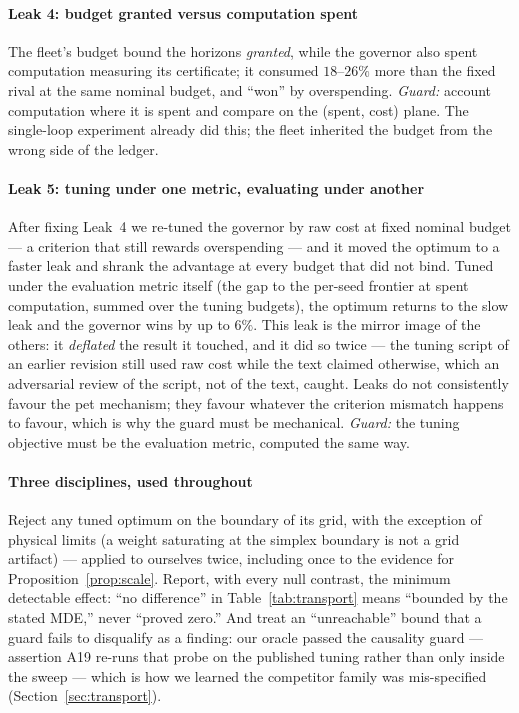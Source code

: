 \documentclass[journal]{IEEEtran}
\theoremstyle{definition}
\begin{document}
\paragraph{Leak 4: budget granted versus computation spent}
The fleet's budget bound the horizons \emph{granted}, while the governor also
spent computation measuring its certificate; it consumed $18$--$26\%$ more
than the fixed rival at the same nominal budget, and ``won'' by
overspending. \emph{Guard:} account computation where it is spent and compare
on the (spent, cost) plane. The single-loop experiment already did this; the
fleet inherited the budget from the wrong side of the ledger.

\paragraph{Leak 5: tuning under one metric, evaluating under another}
After fixing Leak~4 we re-tuned the governor by raw cost at fixed nominal
budget --- a criterion that still rewards overspending --- and it moved the
optimum to a faster leak and shrank the advantage at every budget that did not
bind. Tuned under the evaluation metric itself (the gap to the per-seed
frontier at spent computation, summed over the tuning budgets), the optimum
returns to the slow leak and the governor wins by up to $6\%$. This
leak is the mirror image of the others: it \emph{deflated} the result it
touched, and it did so twice --- the tuning script of an earlier revision still
used raw cost while the text claimed otherwise, which an adversarial review of
the script, not of the text, caught. Leaks do not consistently favour the pet
mechanism; they favour whatever the criterion mismatch happens to favour, which
is why the guard must be mechanical. \emph{Guard:} the tuning objective must
be the evaluation metric, computed the same way.

\paragraph{Three disciplines, used throughout}
Reject any tuned optimum on the boundary of its grid, with the exception of
physical limits (a weight saturating at the simplex boundary is not a grid
artifact) --- applied to ourselves twice, including once to the evidence for
Proposition~\ref{prop:scale}. Report, with every null contrast, the minimum
detectable effect: ``no difference'' in Table~\ref{tab:transport} means
``bounded by the stated MDE,'' never ``proved zero.'' And treat an
``unreachable'' bound that a guard fails to disqualify as a finding: our
oracle passed the causality guard --- assertion A19 re-runs that probe on
the published tuning rather than only inside the sweep --- which is how we
learned the competitor
family was mis-specified (Section~\ref{sec:transport}).
\end{document}
